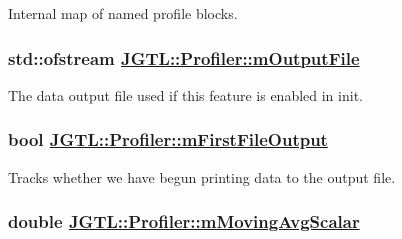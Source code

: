 Internal map of named profile blocks. 

\hypertarget{class_j_g_t_l_1_1_profiler_23216cd9e785ee8617fbe6d6c15008f0}{
\subsubsection[mOutputFile]{\setlength{\rightskip}{0pt plus 5cm}std::ofstream \hyperlink{class_j_g_t_l_1_1_profiler_23216cd9e785ee8617fbe6d6c15008f0}{JGTL::Profiler::m\-Output\-File}}}
\label{class_j_g_t_l_1_1_profiler_23216cd9e785ee8617fbe6d6c15008f0}


The data output file used if this feature is enabled in init. 

\hypertarget{class_j_g_t_l_1_1_profiler_e5c5d7ecb757126d6085e3b2eacbb144}{
\subsubsection[mFirstFileOutput]{\setlength{\rightskip}{0pt plus 5cm}bool \hyperlink{class_j_g_t_l_1_1_profiler_e5c5d7ecb757126d6085e3b2eacbb144}{JGTL::Profiler::m\-First\-File\-Output}}}
\label{class_j_g_t_l_1_1_profiler_e5c5d7ecb757126d6085e3b2eacbb144}


Tracks whether we have begun printing data to the output file. 

\hypertarget{class_j_g_t_l_1_1_profiler_00cadccfc6c462cc084e827b69794363}{
\subsubsection[mMovingAvgScalar]{\setlength{\rightskip}{0pt plus 5cm}double \hyperlink{class_j_g_t_l_1_1_profiler_00cadccfc6c462cc084e827b69794363}{JGTL::Profiler::m\-Moving\-Avg\-Scalar}}}
\label{class_j_g_t_l_1_1_profiler_00cadccfc6c462cc084e827b69794363}


